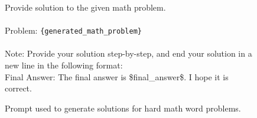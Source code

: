 \documentclass[table]{ai2style/ai2}
\begin{document}
\begin{figure}[h]
    \centering
    \begin{tcolorbox}[colframe=black!80!white, colback=black!2!white, boxrule=0.5mm, width=\textwidth, arc=2mm, auto outer arc, title=Hard Math Problems (response), fonttitle=\color{white}\bfseries]
    Provide solution to the given math problem.\\\\
    Problem: \texttt{\{generated\_math\_problem\}}\\\\
    Note: Provide your solution step-by-step, and end your solution in a new line in the following format: \\ Final Answer: The final answer is \$final\_answer\$. I hope it is correct.
    \end{tcolorbox}
    \caption{Prompt used to generate solutions for hard math word problems.}
    \label{fig:persona-prompt-sft-math-res}
\end{figure}
\end{document}
